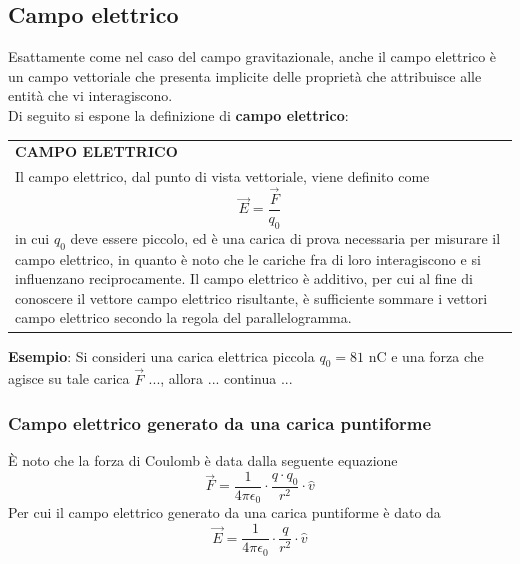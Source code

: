 \documentclass[a4paper]{extarticle}
\renewcommand\arraystretch{}
\begin{document}
\vspace{1em}
\noindent
\subsection{Campo elettrico}
Esattamente come nel caso del campo gravitazionale, anche il campo elettrico è un campo vettoriale che presenta implicite delle proprietà che attribuisce alle entità che vi interagiscono.\\
Di seguito si espone la definizione di \textbf{campo elettrico}:

\vspace{1em}
\setlength{\tabcolsep}{14pt}
\renewcommand{\arraystretch}{2}
\noindent
\begin{tabularx}{\textwidth}{@{}|P|@{}}
    \hline
    {\textbf{CAMPO ELETTRICO}}\\
    \parbox{\linewidth}{Il campo elettrico, dal punto di vista vettoriale, viene definito come
    \[\vec{E} = \frac{\vec{F}}{q_0}\]
    in cui $q_0$ deve essere piccolo, ed è una carica di prova necessaria per misurare il campo elettrico, in quanto è noto che le cariche fra di loro interagiscono e si influenzano reciprocamente.\\
    Il campo elettrico è additivo, per cui al fine di conoscere il vettore campo elettrico risultante, è sufficiente sommare i vettori campo elettrico secondo la regola del parallelogramma.\vspace{3mm}}\\
    \hline
\end{tabularx}

\vspace{2em}
\noindent
\textbf{Esempio}: Si consideri una carica elettrica piccola $q_0=81 \text{ nC}$ e una forza che agisce su tale carica $\vec{F}$ ..., allora ... continua ...

\vspace{1em}
\noindent
\subsubsection{Campo elettrico generato da una carica puntiforme}
È noto che la forza di Coulomb è data dalla seguente equazione
\[\boxed{\vec F = \frac{1}{4 \pi \epsilon_0} \cdot \frac{q \cdot q_0}{r^2} \cdot \hat{v}}\]
Per cui il campo elettrico generato da una carica puntiforme è dato da
\[\boxed{\vec E = \frac{1}{4 \pi \epsilon_0} \cdot \frac{q}{r^2} \cdot \hat{v}}\]
\end{document}
